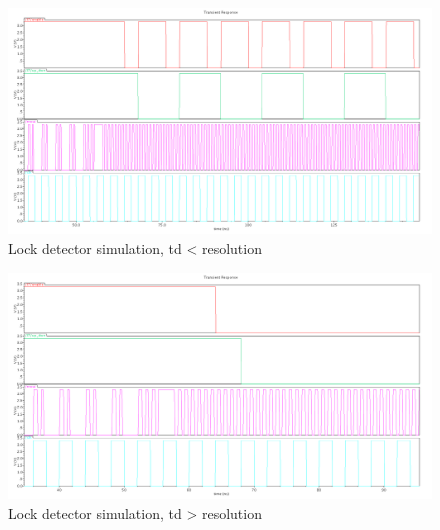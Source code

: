 \documentclass[a4paper,12pt]{article} \usepackage{graphicx}
\begin{document}
\begin{figure}[p]
        \centering
        \includegraphics[width=\textwidth]{../Bilder/LD.png}
        \caption{Lock detector simulation, td < resolution}
        \label{fig:LD_sim1}
\end{figure}
\begin{figure}[p]
        \centering
        \includegraphics[width=\textwidth]{../Bilder/LD_sim.png}
        \caption{Lock detector simulation, td > resolution}
        \label{fig:LD_sim2}
\end{figure}
\end{document}
